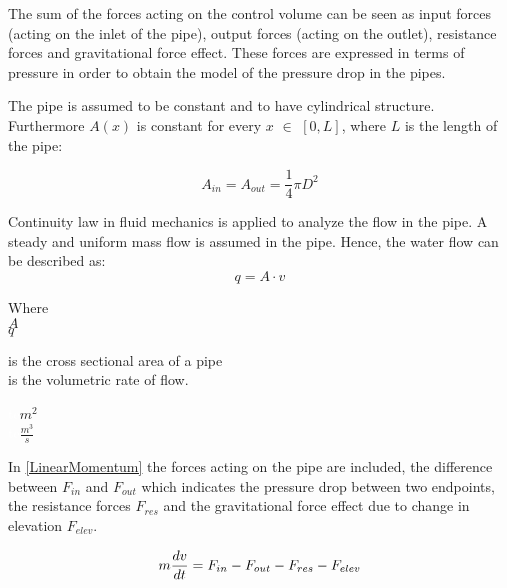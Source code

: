 The sum of the forces acting on the control volume can be seen as input forces (acting on the inlet of the pipe), output forces (acting on the outlet), resistance forces and gravitational force effect.  
These forces are expressed in terms of pressure in order to obtain the model of the pressure drop in the pipes. 

The pipe is assumed to be constant and to have cylindrical structure. Furthermore $A(x)$ is constant for every $x$ $\in$ $[0,L]$, where $L$ is the length of the pipe:

\begin{equation}
  A_{in} = A_{out} = \frac{1}{4}\pi D^{2}
\end{equation}

Continuity law in fluid mechanics is applied to analyze the flow in the pipe.\cite{Hunt_Fluidmechanics} A steady and uniform mass flow is assumed in the pipe. Hence, the water flow can be described as: 
\begin{equation}
  q=A \cdot v
	\label{EquationOfContinuity}
\end{equation}

 \begin{minipage}[t]{0.20\textwidth}
Where\\
\hspace*{8mm} $A$ \\
\hspace*{8mm} $q$ 
\end{minipage}
\begin{minipage}[t]{0.68\textwidth}
\vspace*{2mm}
is the cross sectional area of a pipe\\
is the volumetric rate of flow.

\end{minipage}
\begin{minipage}[t]{0.10\textwidth}
\vspace*{2mm}
\textcolor{White}{te}$\unit{m^{2}}$\\
\textcolor{White}{te}$\unit{\frac{m^{3}}{s}}$
\end{minipage}

 In \eqref{LinearMomentum} the forces acting on the pipe are included, the difference between $F_{in}$ and $F_{out}$ which indicates the pressure drop 
 between two endpoints, the resistance forces $F_{res}$ and the gravitational force effect due to change in elevation $F_{elev}$.

\begin{equation}
  m \frac{dv}{dt} = F_{in} - F_{out} - F_{res} - F_{elev} \\
  \label{LinearMomentum}
\end{equation}

